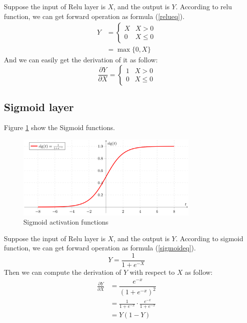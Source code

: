 \documentclass{elegantbook}
\begin{document}
Suppose the input of Relu layer is $X$, and the output is $Y$. According to relu function, we can get forward operation as formula (\ref{relueq}).
\begin{equation}\label{relueq}\begin{aligned}
Y&=\left\{\begin{array}{cc}
X & X>0 \\
0 & X\le 0
\end{array}\right. \\
&=\max\{0,X\}
\end{aligned}
\end{equation}
And we can easily get the derivation of it as follow:
\begin{equation}
\label{brelu}
\frac{\partial Y}{\partial X}=\left\{\begin{array}{cc}
1 & X>0 \\
0 & X\le 0
\end{array}\right.
\end{equation}

\subsection{Sigmoid layer}
Figure \ref{sigmoid} show the Sigmoid functions. 
\begin{figure}[!ht]
	\centering
	\includegraphics[width=0.8\textwidth]{Sigmoid.png}
	\caption{\label{sigmoid}Sigmoid activation functions}
\end{figure}

Suppose the input of Relu layer is $X$, and the output is $Y$. According to sigmoid function, we can get forward operation as formula (\ref{sigmoideq}).
\begin{equation}
\label{sigmoideq}
Y = \frac{1}{1+e^{-X}}
\end{equation}
Then we can compute the derivation of $Y$ with respect to $X$ as follow:
\begin{equation}
\begin{aligned}
\frac{\partial Y}{\partial X}&=\dfrac{e^{-x}}{\left(1+e^{-x}\right)^2} \\
&=\frac{1}{1+e^{-x}}\cdot\frac{e^{-x}}{1+e^{-x}} \\
&=Y(1-Y)
\end{aligned}
\end{equation}
\end{document}
